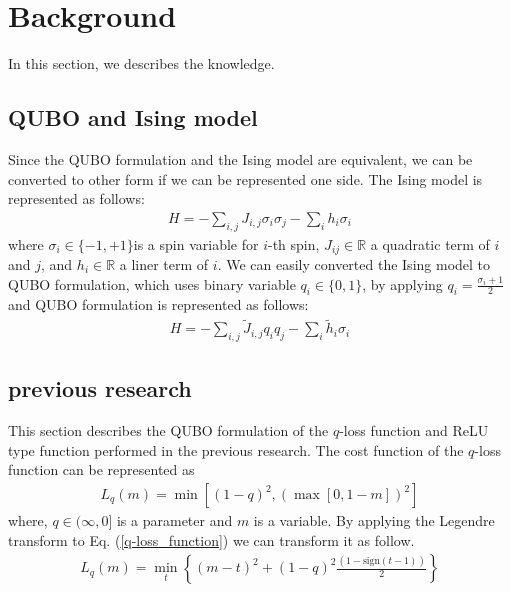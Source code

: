 \documentclass[fp,twocolumn]{jpsj3}
\begin{document}
\section{Background}
In this section, we describes the knowledge.

\subsection{QUBO and Ising model} %
Since the QUBO formulation and the Ising model are equivalent, we can be converted to other form if we can be represented one side. The Ising model is represented as follows:
\begin{eqnarray}
  H=-\sum_{i,j}{J_{i,j}\sigma_{i}\sigma_{j}}-\sum_{i}{h_{i}\sigma_{i}}
\end{eqnarray}
where $\sigma_{i}\in \{-1,+1\}$is a spin variable for $i$-th spin, $J_{ij}\in \mathbb{R}$ a quadratic term of $i$ and $j$, and $h_{i}\in \mathbb{R}$ a liner term of $i$. We can easily converted the Ising model to QUBO formulation, which uses binary variable $q_{i}\in \{0,1\}$, by applying $q_{i}=\frac{\sigma_{i}+1}{2}$ and QUBO formulation is represented as follows:
\begin{eqnarray}
  H=-\sum_{i,j}{\tilde{J}_{i,j}q_{i}q_{j}}-\sum_{i}{\tilde{h}_{i}\sigma_{i}}
\end{eqnarray}

\subsection{previous research}
This section describes the QUBO formulation of the $q$-loss function and ReLU type function performed in the previous research.
The cost function of the $q$-loss function can be represented as 
\begin{eqnarray}
  L_{q}(m)=\min{[(1-q)^{2}, (\max{[0,1-m]})^{2}]} \label{q-loss_function}
\end{eqnarray}
where, $q\in (\infty,0]$ is a parameter and $m$ is a variable. By applying the Legendre transform to Eq. (\ref{q-loss_function}) we can transform it as follow.
\begin{eqnarray}
  L_{q}(m)=\min_{t}{\left\{(m-t)^{2}+(1-q)^{2}\frac{(1-\text{sign}(t-1))}{2}\right\}} \label{q-loss_function_legendre}
\end{eqnarray}
\end{document}
